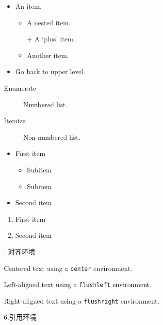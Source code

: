 \documentclass[12pt,UTF8]{ctexart}%
\begin{document}
\begin{itemize}
\item An item.
\begin{itemize}
\item A nested item.
\item[+] A `plus' item.
\item Another item.
\end{itemize}
\item Go back to upper level.
\end{itemize}



\begin{description}
\item[Enumerate] Numbered list.
\item[Itemize] Non-numbered list.
\end{description}




\renewcommand{\labelitemi}{\ddag}
\renewcommand{\labelitemii}{\dag}
\begin{itemize}
\item First item
\begin{itemize}
\item Subitem
\item Subitem
\end{itemize}
\item Second item
\end{itemize}



\renewcommand{\labelenumi}%
{\Alph{enumi}}
\begin{enumerate}
\item First item
\item Second item
\end{enumerate}


. 对齐环境\par

\begin{center}
Centered text using a
\verb|center| environment.
\end{center}
\begin{flushleft}
Left-aligned text using a
\verb|flushleft| environment.
\end{flushleft}
\begin{flushright}
Right-aligned text using a
\verb|flushright| environment.
\end{flushright}



6.引用环境\par
\end{document}
